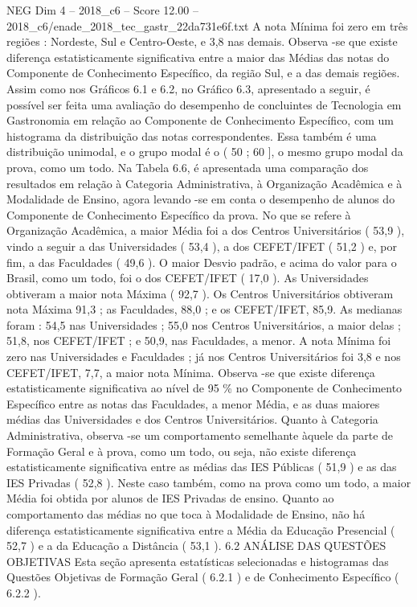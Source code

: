 \begin{textsample}{NEG Dim 4 – 2018\_c6 – Score 12.00 – 2018\_c6/enade\_2018\_tec\_gastr\_22da731e6f.txt}
A nota Mínima foi zero em três regiões : Nordeste, Sul e Centro-Oeste, e 3,8 nas demais.
Observa -se que existe diferença estatisticamente significativa entre a maior das Médias das notas do Componente de Conhecimento Específico, da região Sul, e a das demais regiões.
Assim como nos Gráficos 6.1 e 6.2, no Gráfico 6.3, apresentado a seguir, é possível ser feita uma avaliação do desempenho de concluintes de Tecnologia em Gastronomia em relação ao Componente de Conhecimento Específico, com um histograma da distribuição das notas correspondentes.
Essa também é uma distribuição unimodal, e o grupo modal é o ( 50 ; 60 ], o mesmo grupo modal da prova, como um todo.
Na Tabela 6.6, é apresentada uma comparação dos resultados em relação à Categoria Administrativa, à Organização Acadêmica e à Modalidade de Ensino, agora levando -se em conta o desempenho de alunos do Componente de Conhecimento Específico da prova.
No que se refere à Organização Acadêmica, a maior Média foi a dos Centros Universitários ( 53,9 ), vindo a seguir a das Universidades ( 53,4 ), a dos CEFET/IFET ( 51,2 ) e, por fim, a das Faculdades ( 49,6 ).
O maior Desvio padrão, e acima do valor para o Brasil, como um todo, foi o dos CEFET/IFET ( 17,0 ).
As Universidades obtiveram a maior nota Máxima ( 92,7 ).
Os Centros Universitários obtiveram nota Máxima 91,3 ; as Faculdades, 88,0 ; e os CEFET/IFET, 85,9.
As medianas foram : 54,5 nas Universidades ; 55,0 nos Centros Universitários, a maior delas ; 51,8, nos CEFET/IFET ; e 50,9, nas Faculdades, a menor.
A nota Mínima foi zero nas Universidades e Faculdades ; já nos Centros Universitários foi 3,8 e nos CEFET/IFET, 7,7, a maior nota Mínima.
Observa -se que existe diferença estatisticamente significativa ao nível de 95 \% no Componente de Conhecimento Específico entre as notas das Faculdades, a menor Média, e as duas maiores médias das Universidades e dos Centros Universitários.
Quanto à Categoria Administrativa, observa -se um comportamento semelhante àquele da parte de Formação Geral e à prova, como um todo, ou seja, não existe diferença estatisticamente significativa entre as médias das IES Públicas ( 51,9 ) e as das IES Privadas ( 52,8 ).
Neste caso também, como na prova como um todo, a maior Média foi obtida por alunos de IES Privadas de ensino.
Quanto ao comportamento das médias no que toca à Modalidade de Ensino, não há diferença estatisticamente significativa entre a Média da Educação Presencial ( 52,7 ) e a da Educação a Distância ( 53,1 ). 6.2 ANÁLISE DAS QUESTÕES OBJETIVAS Esta seção apresenta estatísticas selecionadas e histogramas das Questões Objetivas de Formação Geral ( 6.2.1 ) e de Conhecimento Específico ( 6.2.2 ).

\end{textsample}

